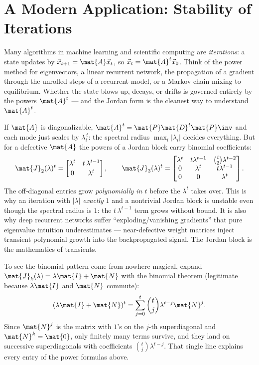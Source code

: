 \section{A Modern Application: Stability of Iterations}
\label{ch28:application}

\begin{applicationbox}
Many algorithms in machine learning and scientific computing are \emph{iterations}: a
state updates by $\vec{x}_{t+1}=\mat{A}\vec{x}_t$, so $\vec{x}_t=\mat{A}^t\vec{x}_0$.
Think of the power method for eigenvectors, a linear recurrent network, the propagation
of a gradient through the unrolled steps of a recurrent model, or a Markov chain mixing
to equilibrium. Whether the state blows up, decays, or drifts is governed entirely by the
powers $\mat{A}^t$ --- and the Jordan form is the cleanest way to understand $\mat{A}^t$.

If $\mat{A}$ is diagonalizable, $\mat{A}^t=\mat{P}\mat{D}^t\mat{P}\inv$ and each mode just
scales by $\lambda_i^{\,t}$: the spectral radius $\max_i|\lambda_i|$ decides everything.
But for a defective $\mat{A}$ the powers of a Jordan block carry binomial coefficients:
\[
\mat{J}_2(\lambda)^t=\begin{bmatrix}\lambda^t & t\,\lambda^{t-1}\\[2pt]0&\lambda^t\end{bmatrix},
\qquad
\mat{J}_3(\lambda)^t=\begin{bmatrix}\lambda^t & t\lambda^{t-1} & \binom{t}{2}\lambda^{t-2}\\
0 & \lambda^t & t\lambda^{t-1}\\ 0&0&\lambda^t\end{bmatrix}.
\]
The off-diagonal entries grow \emph{polynomially in $t$} before the $\lambda^t$ takes
over. This is why an iteration with $|\lambda|$ \emph{exactly} $1$ and a nontrivial Jordan
block is unstable even though the spectral radius is $1$: the $t\,\lambda^{t-1}$ term
grows without bound. It is also why deep recurrent networks suffer ``exploding/vanishing
gradients'' that pure eigenvalue intuition underestimates --- near-defective weight
matrices inject transient polynomial growth into the backpropagated signal. The Jordan
block is the mathematics of transients.
\end{applicationbox}

To see the binomial pattern come from nowhere magical, expand
$\mat{J}_k(\lambda)=\lambda\mat{I}+\mat{N}$ with the binomial theorem (legitimate because
$\lambda\mat{I}$ and $\mat{N}$ commute):
\[
(\lambda\mat{I}+\mat{N})^t=\sum_{j=0}^{t}\binom{t}{j}\lambda^{t-j}\mat{N}^{j}.
\]
Since $\mat{N}^j$ is the matrix with $1$'s on the $j$-th superdiagonal and $\mat{N}^k=\mat{0}$,
only finitely many terms survive, and they land on successive superdiagonals with
coefficients $\binom{t}{j}\lambda^{t-j}$. That single line explains every entry of the
power formulas above.

